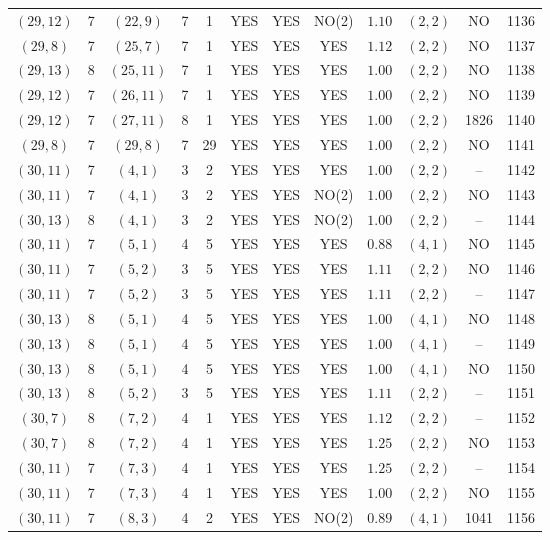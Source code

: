 \begin{longtable}{|c|c|c|c|c|c|c|c|c|c|c|c|}
$(29,12)$ & 7 & $(22,9)$ & 7 & 1 & YES & YES & NO(2) & $1.10$ & $(2,2)$ & NO & 1136\\
$(29,8)$ & 7 & $(25,7)$ & 7 & 1 & YES & YES & YES & $1.12$ & $(2,2)$ & NO & 1137\\
$(29,13)$ & 8 & $(25,11)$ & 7 & 1 & YES & YES & YES & $1.00$ & $(2,2)$ & NO & 1138\\
$(29,12)$ & 7 & $(26,11)$ & 7 & 1 & YES & YES & YES & $1.00$ & $(2,2)$ & NO & 1139\\
$(29,12)$ & 7 & $(27,11)$ & 8 & 1 & YES & YES & YES & $1.00$ & $(2,2)$ & 1826 & 1140\\
$(29,8)$ & 7 & $(29,8)$ & 7 & 29 & YES & YES & YES & $1.00$ & $(2,2)$ & NO & 1141\\
$(30,11)$ & 7 & $(4,1)$ & 3 & 2 & YES & YES & YES & $1.00$ & $(2,2)$ & -- & 1142\\
$(30,11)$ & 7 & $(4,1)$ & 3 & 2 & YES & YES & NO(2) & $1.00$ & $(2,2)$ & NO & 1143\\
$(30,13)$ & 8 & $(4,1)$ & 3 & 2 & YES & YES & NO(2) & $1.00$ & $(2,2)$ & -- & 1144\\
$(30,11)$ & 7 & $(5,1)$ & 4 & 5 & YES & YES & YES & $0.88$ & $(4,1)$ & NO & 1145\\
$(30,11)$ & 7 & $(5,2)$ & 3 & 5 & YES & YES & YES & $1.11$ & $(2,2)$ & NO & 1146\\
$(30,11)$ & 7 & $(5,2)$ & 3 & 5 & YES & YES & YES & $1.11$ & $(2,2)$ & -- & 1147\\
$(30,13)$ & 8 & $(5,1)$ & 4 & 5 & YES & YES & YES & $1.00$ & $(4,1)$ & NO & 1148\\
$(30,13)$ & 8 & $(5,1)$ & 4 & 5 & YES & YES & YES & $1.00$ & $(4,1)$ & -- & 1149\\
$(30,13)$ & 8 & $(5,1)$ & 4 & 5 & YES & YES & YES & $1.00$ & $(4,1)$ & NO & 1150\\
$(30,13)$ & 8 & $(5,2)$ & 3 & 5 & YES & YES & YES & $1.11$ & $(2,2)$ & -- & 1151\\
$(30,7)$ & 8 & $(7,2)$ & 4 & 1 & YES & YES & YES & $1.12$ & $(2,2)$ & -- & 1152\\
$(30,7)$ & 8 & $(7,2)$ & 4 & 1 & YES & YES & YES & $1.25$ & $(2,2)$ & NO & 1153\\
$(30,11)$ & 7 & $(7,3)$ & 4 & 1 & YES & YES & YES & $1.25$ & $(2,2)$ & -- & 1154\\
$(30,11)$ & 7 & $(7,3)$ & 4 & 1 & YES & YES & YES & $1.00$ & $(2,2)$ & NO & 1155\\
$(30,11)$ & 7 & $(8,3)$ & 4 & 2 & YES & YES & NO(2) & $0.89$ & $(4,1)$ & 1041 & 1156\\

\end{longtable}

